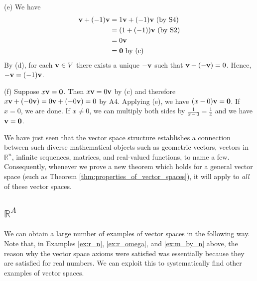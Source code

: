 \documentclass[12pt,letterpaper,reqno]{article}
\numberwithin{equation}{section}
\begin{document}
\begin{pf}
(e) We have
	\begin{align*}
		{\bf v}+(-1){\bf v} &=1{\bf v}+(-1){\bf v} \text{ (by S4)}\\
		&=(1+(-1)){\bf v} \text{ (by S2)}\\
		&=0{\bf v} \\
		&={\bf 0} \text{ by (c)}
	\end{align*}
By (d), for each ${\bf v} \in V$ there exists a unique $-{\bf v}$ such that ${\bf v}+(-{\bf v})=0$. Hence, $-{\bf v}=(-1){\bf v}$.

(f) Suppose $x{\bf v}={\bf 0}$. Then $x{\bf v}=0{\bf v}$ by (c) and therefore $x{\bf v}+(-0{\bf v})=0{\bf v}+(-0{\bf v})=0$ by A4. Applying (e), we have $(x-0){\bf v}={\bf 0}$. If $x=0$, we are done. If $x \neq 0$, we can multiply both sides by $\frac{1}{x-0}=\frac{1}{x}$ and we have ${\bf v}={\bf 0}$.
\end{pf}

We have just seen that the vector space structure establishes a connection between such diverse mathematical objects such as geometric vectors, vectors in $\mathbb{R}^n$, infinite sequences, matrices, and real-valued functions, to name a few. Consequently, whenever we prove a new theorem which holds for a general vector space (such as Theorem \ref{thm:properties_of_vector_spaces}), it will apply to \emph{all} of these vector spaces.

\subsection{$\mathbb{R}^A$}\label{sec:r_a}
We can obtain a large number of examples of vector spaces in the following way. Note that, in Examples \ref{ex:r_n}, \ref{ex:r_omega}, and \ref{ex:m_by_n} above, the reason why the vector space axioms were satisfied was essentially because they are satisfied for real numbers. We can exploit this to systematically find other examples of vector spaces.
\end{document}
